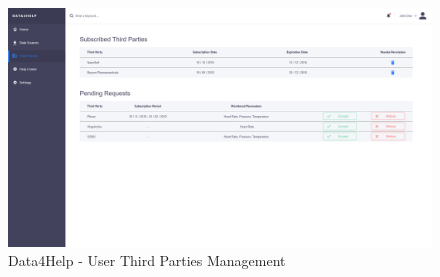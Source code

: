\begin{figure}
\centering
  \includegraphics[width=\linewidth]{../Mockups/Data4Help/User - Third Parties Management.png}
  \caption{Data4Help - User Third Parties Management}
\end{figure}